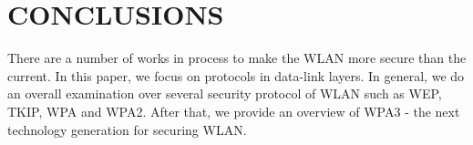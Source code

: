 \section{CONCLUSIONS}

There are a number of works in process to make the \ac{WLAN} more secure than the current. In this paper, we focus on protocols in data-link layers. In general, we do an overall examination over several security protocol of \ac{WLAN} such as \ac{WEP}, \ac{TKIP}, \ac{WPA} and \ac{WPA}2. After that, we provide an overview of \ac{WPA}3 - the next technology generation for securing \ac{WLAN}.